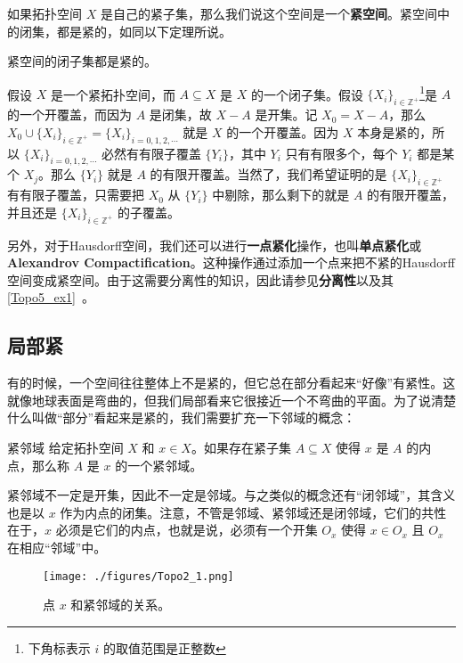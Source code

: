 如果拓扑空间 $X$ 是自己的紧子集，那么我们说这个空间是一个\textbf{紧空间}。紧空间中的闭集，都是紧的，如同以下定理所说。

\begin{theorem}{}\label{Topo2_the2}
紧空间的闭子集都是紧的。
\end{theorem}

假设 $X$ 是一个紧拓扑空间，而 $A\subseteq X$ 是 $X$ 的一个闭子集。假设 $\{X_i\}_{i\in \mathbb{Z}^+}$\footnote{下角标表示 $i$ 的取值范围是正整数}是 $A$ 的一个开覆盖，而因为 $A$ 是闭集，故 $X-A$ 是开集。记 $X_0=X-A$，那么 $X_0\cup\{X_i\}_{i\in \mathbb{Z}^+}=\{X_i\}_{i=0, 1, 2, \cdots}$ 就是 $X$ 的一个开覆盖。因为 $X$ 本身是紧的，所以 $\{X_i\}_{i=0, 1, 2, \cdots}$ 必然有有限子覆盖 $\{Y_i\}$，其中 $Y_i$ 只有有限多个，每个 $Y_i$ 都是某个 $X_j$。那么 $\{Y_i\}$ 就是 $A$ 的有限开覆盖。当然了，我们希望证明的是 $\{X_i\}_{i\in \mathbb{Z}^+}$ 有有限子覆盖，只需要把 $X_0$ 从 $\{Y_i\}$ 中剔除，那么剩下的就是 $A$ 的有限开覆盖，并且还是 $\{X_i\}_{i\in \mathbb{Z}^+}$ 的子覆盖。

另外，对于Hausdorff空间，我们还可以进行\textbf{一点紧化}操作，也叫\textbf{单点紧化}或\textbf{Alexandrov Compactification}。这种操作通过添加一个点来把不紧的Hausdorff空间变成紧空间。由于这需要分离性的知识，因此请参见\textbf{分离性}以及其\autoref{Topo5_ex1}~。

\subsection{局部紧}

有的时候，一个空间往往整体上不是紧的，但它总在部分看起来“好像”有紧性。这就像地球表面是弯曲的，但我们局部看来它很接近一个不弯曲的平面。为了说清楚什么叫做“部分”看起来是紧的，我们需要扩充一下邻域的概念：

\begin{definition}{紧邻域}
给定拓扑空间 $X$ 和 $x\in X$。如果存在紧子集 $A\subseteq X$ 使得 $x$ 是 $A$ 的内点，那么称 $A$ 是 $x$ 的一个紧邻域。
\end{definition}

紧邻域不一定是开集，因此不一定是邻域。与之类似的概念还有“闭邻域”，其含义也是以 $x$ 作为内点的闭集。注意，不管是邻域、紧邻域还是闭邻域，它们的共性在于，$x$ 必须是它们的内点，也就是说，必须有一个开集 $O_x$ 使得 $x\in O_x$ 且 $O_x$ 在相应“邻域”中。

\begin{figure}[ht]
\centering
\texttt{[image: ./figures/Topo2\_1.png]}
\caption{点 $x$ 和紧邻域的关系。} \label{Topo2_fig1}
\end{figure}


